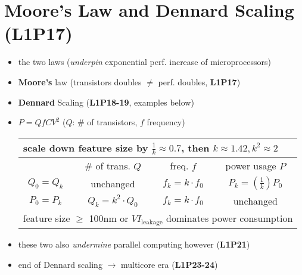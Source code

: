 \section*{Moore's Law and Dennard Scaling (\textbf{L1P17})}

\begin{itemize}
  \item the two laws (\emph{underpin} exponential perf. increase of microprocessors)
  \item \textbf{Moore's} law (transistors doubles $\ne$ perf. doubles, \textbf{L1P17})
  \item \textbf{Dennard} Scaling (\textbf{L1P18-19}, examples below)
  \item[] $P = QfCV^{2}$ ($Q$: \# of transistors, $f$ frequency)
  \begin{tabular}{c|ccc}
    \hline
    \multicolumn{4}{l}{scale down feature size by  $\frac{1}{k}\approx 0.7$, then $k\approx 1.42, k^{2}\approx 2$} \\
    \hline
    & \# of trans. $Q$ & freq. $f$ & power usage $P$  \\
    \hline
    $Q_{0} = Q_{k}$ & unchanged & $f_k = k \cdot f_0$ & $P_k = (\frac{1}{k})P_0$\\
    $P_{0} = P_{k}$ & $Q_k = k^{2} \cdot Q_0$ & $f_k = k \cdot f_0$ & unchanged  \\
    \hline
    \multicolumn{4}{l}{feature size $\geq$ 100nm or $VI_{\text{leakage}}$  dominates power consumption} \\
    \hline
  \end{tabular}
\item these two also \emph{undermine} parallel computing however (\textbf{L1P21})
\item end of Dennard scaling $\rightarrow$ multicore era (\textbf{L1P23-24})
\end{itemize}
